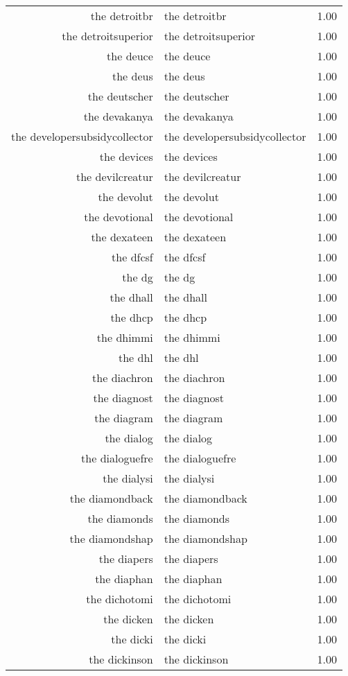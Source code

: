 \begin{table}[ht]
\begin{tabular}{rlr}
  the detroitbr & the detroitbr & 1.00 \\ 
  the detroitsuperior & the detroitsuperior & 1.00 \\ 
  the deuce & the deuce & 1.00 \\ 
  the deus & the deus & 1.00 \\ 
  the deutscher & the deutscher & 1.00 \\ 
  the devakanya & the devakanya & 1.00 \\ 
  the developersubsidycollector & the developersubsidycollector & 1.00 \\ 
  the devices & the devices & 1.00 \\ 
  the devilcreatur & the devilcreatur & 1.00 \\ 
  the devolut & the devolut & 1.00 \\ 
  the devotional & the devotional & 1.00 \\ 
  the dexateen & the dexateen & 1.00 \\ 
  the dfcsf & the dfcsf & 1.00 \\ 
  the dg & the dg & 1.00 \\ 
  the dhall & the dhall & 1.00 \\ 
  the dhcp & the dhcp & 1.00 \\ 
  the dhimmi & the dhimmi & 1.00 \\ 
  the dhl & the dhl & 1.00 \\ 
  the diachron & the diachron & 1.00 \\ 
  the diagnost & the diagnost & 1.00 \\ 
  the diagram & the diagram & 1.00 \\ 
  the dialog & the dialog & 1.00 \\ 
  the dialoguefre & the dialoguefre & 1.00 \\ 
  the dialysi & the dialysi & 1.00 \\ 
  the diamondback & the diamondback & 1.00 \\ 
  the diamonds & the diamonds & 1.00 \\ 
  the diamondshap & the diamondshap & 1.00 \\ 
  the diapers & the diapers & 1.00 \\ 
  the diaphan & the diaphan & 1.00 \\ 
  the dichotomi & the dichotomi & 1.00 \\ 
  the dicken & the dicken & 1.00 \\ 
  the dicki & the dicki & 1.00 \\ 
  the dickinson & the dickinson & 1.00 \\ 

\end{tabular}
\end{table}
